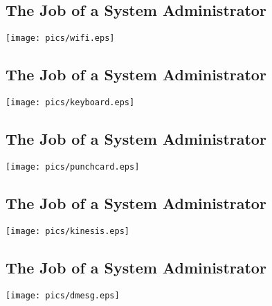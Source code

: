 \documentclass[xga]{xdvislides}
\begin{document}
\subsection{The Job of a System Administrator}
\vspace*{\fill}
\begin{center}
	\texttt{[image: pics/wifi.eps]} \\
\end{center}
\vspace*{\fill}

\subsection{The Job of a System Administrator}
\vspace*{\fill}
\begin{center}
	\texttt{[image: pics/keyboard.eps]} \\
\end{center}
\vspace*{\fill}

\subsection{The Job of a System Administrator}
\vspace*{\fill}
\begin{center}
	\texttt{[image: pics/punchcard.eps]} \\
\end{center}
\vspace*{\fill}

\subsection{The Job of a System Administrator}
\vspace*{\fill}
\begin{center}
	\texttt{[image: pics/kinesis.eps]} \\
\end{center}
\vspace*{\fill}

\subsection{The Job of a System Administrator}
\vspace*{\fill}
\begin{center}
	\texttt{[image: pics/dmesg.eps]} \\
\end{center}
\vspace*{\fill}
\end{document}
